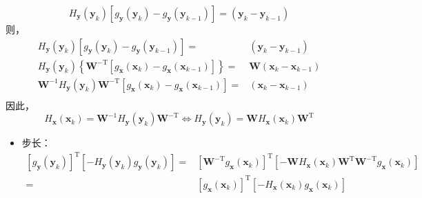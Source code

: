 \documentclass[cn,mtpro2,12pt]{elegantbook}
\begin{document}
\begin{solution}
\begin{enumerate}
\begin{equation}
                  H_{\mathbf{y}}(\mathbf{y}_{k})\left[g_{\mathbf{y}}(\mathbf{y}_{k})-g_{\mathbf{y}}(\mathbf{y}_{k-1})\right]=\left(\mathbf{y}_{k}-\mathbf{y}_{k-1}\right)
              \end{equation}
              则，
              \begin{equation}
                  \begin{aligned}
                      H_{\mathbf{y}}(\mathbf{y}_{k})\left[g_{\mathbf{y}}(\mathbf{y}_{k})-g_{\mathbf{y}}(\mathbf{y}_{k-1})\right]=                                         & \left(\mathbf{y}_{k}-\mathbf{y}_{k-1}\right)           \\
                      H_{\mathbf{y}}(\mathbf{y}_{k})\left\{\mathbf{W}^{\mathrm{-T}}\left[g_{\mathbf{x}}(\mathbf{x}_{k})-g_{\mathbf{x}}(\mathbf{x}_{k-1})\right]\right\} = & \mathbf{W}\left(\mathbf{x}_{k}-\mathbf{x}_{k-1}\right) \\
                      \mathbf{W}^{-1}H_{\mathbf{y}}(\mathbf{y}_{k})\mathbf{W}^{\mathrm{-T}}\left[g_{\mathbf{x}}(\mathbf{x}_{k})-g_{\mathbf{x}}(\mathbf{x}_{k-1})\right] = & \left(\mathbf{x}_{k}-\mathbf{x}_{k-1}\right)           \\
                  \end{aligned}
              \end{equation}
              因此，
              \begin{equation}
                  H_{\mathbf{x}}(\mathbf{x}_{k})=\mathbf{W}^{-1}H_{\mathbf{y}}(\mathbf{y}_{k})\mathbf{W}^{\mathrm{-T}}\Longleftrightarrow H_{\mathbf{y}}(\mathbf{y}_{k})=\mathbf{W}H_{\mathbf{x}}(\mathbf{x}_{k})\mathbf{W}^{\mathrm{T}}
              \end{equation}
              \begin{itemize}
                  \item 步长：
                        \begin{equation}
                            \begin{aligned}
                                \left[g_{\mathbf{y}}(\mathbf{y}_{k})\right]^{\mathrm{T}}\left[-H_{\mathbf{y}}(\mathbf{y}_{k})g_{\mathbf{y}}(\mathbf{y}_{k})\right]= & \left[\mathbf{W}^{\mathrm{-T}}g_{\mathbf{x}}(\mathbf{x}_{k})\right]^{\mathrm{T}}\left[-\mathbf{W}H_{\mathbf{x}}(\mathbf{x}_{k})\mathbf{W}^{\mathrm{T}}\mathbf{W}^{\mathrm{-T}}g_{\mathbf{x}}(\mathbf{x}_{k})\right] \\
                                =                                                                                                                                   & \left[g_{\mathbf{x}}(\mathbf{x}_{k})\right]^{\mathrm{T}}\left[-H_{\mathbf{x}}(\mathbf{x}_{k})g_{\mathbf{x}}(\mathbf{x}_{k})\right]

\end{aligned}
\end{equation}
\end{itemize}
\end{enumerate}
\end{solution}
\end{document}
